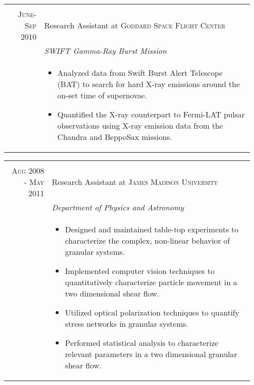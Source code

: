 \documentclass[a4paper,10pt]{article}
\begin{document}
\begin{tabular}{r|p{11cm}}
 \multicolumn{2}{c}{} \\
 \textsc{June-Sep 2010} & Research Assistant at \textsc{Goddard Space Flight Center} \\&\emph{SWIFT Gamma-Ray Burst Mission}\\&\footnotesize{
 \begin{itemize}
\item Analyzed data from Swift Burst Alert Telescope (BAT) to search for hard X-ray emissions around the on-set time of supernovae.
\item Quantified the X-ray counterpart to Fermi-LAT pulsar observations using X-ray emission data from the Chandra and BeppoSax missions.
\end{itemize}
 }\\
 \end{tabular}
\begin{tabular}{r|p{11cm}}
 
 \multicolumn{2}{c}{} \\
\textsc{Aug 2008 - May 2011} & Research Assistant at \textsc{James Madison University}\\&\emph{Department of Physics and Astronomy}\\&\footnotesize{
\begin{itemize}

\item Designed and maintained table-top experiments to characterize the complex, non-linear behavior of granular systems.
\item Implemented computer vision techniques to quantitatively characterize particle movement in a two dimensional shear flow.
\item Utilized optical polarization techniques to quantify stress networks in granular systems.
\item Performed statistical analysis to characterize relevant parameters in a two dimensional granular shear flow.

\end{itemize}
}\\
\end{tabular}

\end{document}
